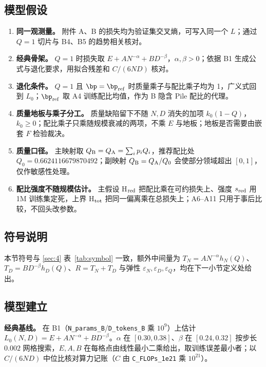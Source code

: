 \subsection{模型假设}
\label{sec:5.3.3}

\begin{enumerate}
\item \textbf{同一观测量。} 附件 A、B 的损失均为验证集交叉熵，可写入同一个 $L$；通过 $Q=1$ 切片与 B4、B5 的趋势相关核对。
\item \textbf{经典骨架。} $Q=1$ 时损失取 $E+AN^{-\alpha}+BD^{-\beta}$，$\alpha,\beta>0$；依据 B1 生成公式与退化要求，用拟合残差和 $C/(6ND)$ 核对。
\item \textbf{退化条件。} $Q=1$ 且 $\bp=\bp_{\rm ref}$ 时质量乘子与配比乘子均为 1，广义式回到 $L_0$；$\bp_{\rm ref}$ 取 A4 训练配比均值，作为 B 隐含 Pile 配比的代理。
\item \textbf{质量地板与乘子分工。} 质量缺陷留下不随 $N,D$ 消失的加项 $k_0(1-Q)$，$k_0\ge0$；配比乘子只乘随规模衰减的两项，不乘 $E$ 与地板；地板是否需要由嵌套 $F$ 检验裁决。
\item \textbf{质量口径。} 主映射取 $Q_{\rm B}=Q_{\rm A}=\sum_i p_iQ_i$，推荐配比处 $Q_0=0.6624116679870492$；副映射 $Q_{\rm B}=Q_{\rm A}/Q_0$ 会使部分领域超出 $[0,1]$，仅作敏感性处理。
\item \textbf{配比强度不随规模估计。} 主假设 H$_{\rm red}$ 把配比乘在可约损失上、强度 $s_{\rm red}$ 用 1M 训练集定死，上界 H$_{\rm tot}$ 把同一偏离乘在总损失上；A6–A11 只用于事后比较，不回头改参数。
\end{enumerate}

\subsection{符号说明}
\label{sec:5.3.4}

本节符号与 \ref{sec:4} 表~\ref{tab:symbol} 一致，额外中间量为 $T_N=AN^{-\alpha}h_N(Q)$、$T_D=BD^{-\beta}h_D(Q)$、$R=T_N+T_D$ 与弹性 $\varepsilon_N,\varepsilon_D,\varepsilon_Q$，均在下一小节定义处给出。

\subsection{模型建立}
\label{sec:5.3.5}

\textbf{经典基线。} 在 B1（\texttt{N\_params\_B}/\texttt{D\_tokens\_B} 乘 $10^9$）上估计 $L_0(N,D)=E+AN^{-\alpha}+BD^{-\beta}$。$\alpha$ 在 $[0.30,0.38]$、$\beta$ 在 $[0.24,0.32]$ 按步长 $0.002$ 网格搜索，$E,A,B$ 在每格点由线性最小二乘给出，取训练误差最小者；以 $C/(6ND)$ 中位比核对算力记账（$C$ 由 \texttt{C\_FLOPs\_1e21} 乘 $10^{21}$）。

